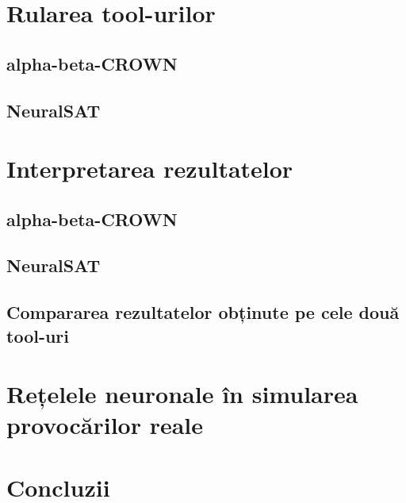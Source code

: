 \documentclass[12pt,a4paper]{report}
\begin{document}
\section{Rularea tool-urilor}

    \subsection{alpha-beta-CROWN}
    
    \subsection{NeuralSAT}
    



\section{Interpretarea rezultatelor}

    \subsection{alpha-beta-CROWN}
    
    \subsection{NeuralSAT}
    
    \subsection{Compararea rezultatelor obținute pe cele două tool-uri}
    



\section{Rețelele neuronale în simularea provocărilor reale}




\section{Concluzii}






\end{document}
